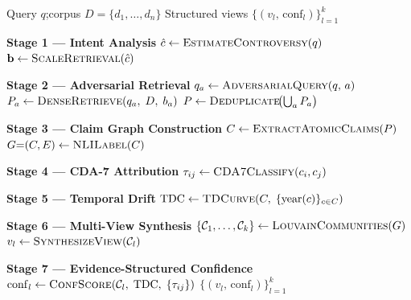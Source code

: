 \documentclass[11pt]{article}
\newcommand{\system}{\textsc{EVIRAG}\xspace}
\begin{document}
\begin{algorithm}[t]
\small
\caption{\system\ Seven-Stage Inference Pipeline}
\label{alg:evirag}
\begin{algorithmic}[1]
\Require Query $q$;\enspace corpus $D = \{d_1,\ldots,d_n\}$
\Ensure Structured views $\{(v_l,\,\mathrm{conf}_l)\}_{l=1}^{k}$

\Statex \textbf{Stage 1 — Intent Analysis}
\State $\hat{c} \gets \textsc{EstimateControversy}(q)$
\State $\mathbf{b} \gets \textsc{ScaleRetrieval}(\hat{c})$
  \hfill{}

\Statex \textbf{Stage 2 — Adversarial Retrieval}
  \State $q_a \gets \textsc{AdversarialQuery}(q,\,a)$
  \State $P_a \gets \textsc{DenseRetrieve}(q_a,\;D,\;b_a)$
\EndFor
\State $P \gets \textsc{Deduplicate}\!\bigl(\textstyle\bigcup_a P_a\bigr)$

\Statex \textbf{Stage 3 — Claim Graph Construction}
\State $C \gets \textsc{ExtractAtomicClaims}(P)$
\State $G{=}(C,E) \gets \textsc{NLILabel}(C)$
  \hfill{}

\Statex \textbf{Stage 4 — CDA-7 Attribution}
  \State $\tau_{ij} \gets \textsc{CDA7Classify}(c_i,c_j)$
    \hfill{}
\EndFor

\Statex \textbf{Stage 5 — Temporal Drift}
\State $\mathrm{TDC} \gets \textsc{TDCurve}(C,\;\{\mathrm{year}(c)\}_{c\in C})$
  \hfill{}

\Statex \textbf{Stage 6 — Multi-View Synthesis}
\State $\{\mathcal{C}_1,\ldots,\mathcal{C}_k\} \gets \textsc{LouvainCommunities}(G)$
  \State $v_l \gets \textsc{SynthesizeView}(\mathcal{C}_l)$
    \hfill{}
\EndFor

\Statex \textbf{Stage 7 — Evidence-Structured Confidence}
  \State $\mathrm{conf}_l \gets \textsc{ConfScore}(\mathcal{C}_l,\;\mathrm{TDC},\;\{\tau_{ij}\})$
\EndFor
\State \Return $\{(v_l,\,\mathrm{conf}_l)\}_{l=1}^{k}$
\end{algorithmic}
\end{algorithm}
\end{document}
